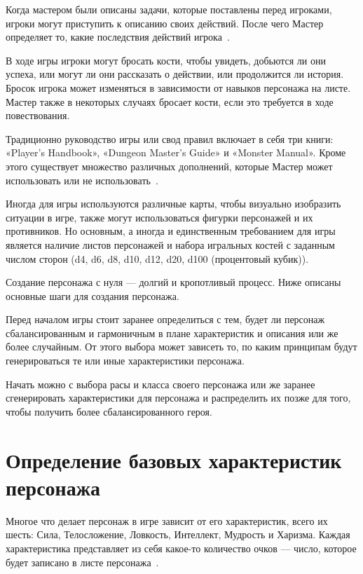 Когда мастером были описаны задачи, которые поставлены перед игроками, игроки могут приступить к описанию своих действий. После чего Мастер определяет то, какие последствия действий игрока~\cite{DnD}.

В ходе игры игроки могут бросать кости, чтобы увидеть, добьются ли они успеха, или могут ли они рассказать о действии, или продолжится ли история. Бросок игрока может изменяться в зависимости от навыков персонажа на листе. Мастер также в некоторых случаях бросает кости, если это требуется в ходе повествования.

Традиционно руководство игры или свод правил включает в себя три книги: «Player’s Handbook», «Dungeon Master’s Guide» и «Monster Manual». Кроме этого существует множество различных дополнений, которые Мастер может использовать или не использовать~\cite{blackcitadelrpg}.

Иногда для игры используются различные карты, чтобы визуально изобразить ситуации в игре, также могут использоваться фигурки персонажей и их противников. Но основным, а иногда и единственным требованием для игры является наличие листов персонажей и набора игральных костей с заданным числом сторон (d4, d6, d8, d10, d12, d20, d100 (процентовый кубик)).

Создание персонажа с нуля --- долгий и кропотливый процесс. Ниже описаны основные шаги для создания персонажа.

Перед началом игры стоит заранее определиться с тем, будет ли персонаж сбалансированным и гармоничным в плане характеристик и описания или же более случайным. От этого выбора может зависеть то, по каким принципам будут генерироваться те или иные характеристики персонажа.

Начать можно с выбора расы и класса своего персонажа или же заранее сгенерировать характеристики для персонажа и распределить их позже для того, чтобы получить более сбалансированного героя.

\section{Определение базовых характеристик персонажа}

Многое что делает персонаж в игре зависит от его характеристик, всего их шесть: Сила, Телосложение, Ловкость, Интеллект, Мудрость и Харизма. Каждая характеристика представляет из себя какое-то количество очков --- число, которое будет записано в листе персонажа~\cite{DnDWiki, Basicrules}.

